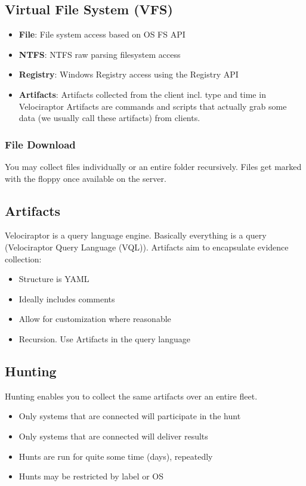 \subsection{Virtual File System (VFS)}
\begin{itemize}
  \item \textbf{File}: File system access based on OS FS API
  \item \textbf{NTFS}: NTFS raw parsing filesystem access
  \item \textbf{Registry}: Windows Registry access using the Registry API
  \item \textbf{Artifacts}: Artifacts collected from the client incl. type and time in Velociraptor Artifacts are commands and scripts that actually grab some data (we usually call these artifacts) from clients.
\end{itemize}

\subsubsection{File Download}
You may collect files individually or an entire folder recursively.
Files get marked with the floppy once available on the server.

\subsection{Artifacts}
Velociraptor is a query language engine.
Basically everything is a query (Velociraptor Query Language (VQL)).
Artifacts aim to encapsulate evidence collection:
\begin{itemize}
  \item Structure is YAML
  \item Ideally includes comments
  \item Allow for customization where reasonable
  \item Recursion. Use Artifacts in the query language
\end{itemize}

\subsection{Hunting}
Hunting enables you to collect the same artifacts over an entire fleet.
\begin{itemize}
  \item Only systems that are connected will participate in the hunt
  \item Only systems that are connected will deliver results
  \item Hunts are run for quite some time (days), repeatedly
  \item Hunts may be restricted by label or OS
\end{itemize}

